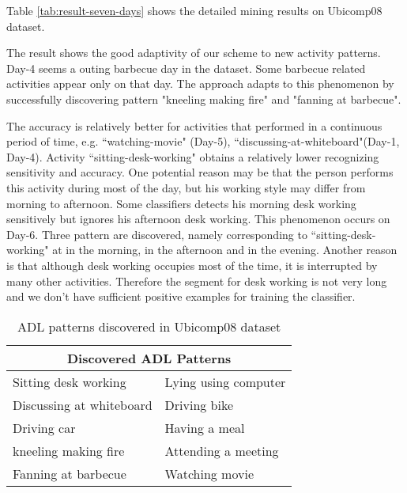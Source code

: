 \documentclass{sigchi}
\begin{document}
     
     Table \ref{tab:result-seven-days} shows the detailed mining results on Ubicomp08 dataset.
     
     The result shows the good adaptivity of our scheme to new activity patterns.
     Day-4 seems a outing barbecue day in the dataset. Some barbecue related activities appear only on that day.
     The approach adapts to this phenomenon by successfully discovering pattern "kneeling making fire" and "fanning at barbecue".

     The accuracy is relatively better for activities that performed in a continuous period of time, e.g. ``watching-movie" (Day-5), ``discussing-at-whiteboard"(Day-1, Day-4).
     Activity ``sitting-desk-working" obtains a relatively lower recognizing sensitivity and accuracy.
     One potential reason may be that the person performs this activity during most of the day, but his working style may differ from morning to afternoon.
     Some classifiers detects his morning desk working sensitively but ignores his afternoon desk working.
     This phenomenon occurs on Day-6. Three pattern are discovered, namely corresponding to ``sitting-desk-working" at in the morning, in the afternoon and in the evening.
     Another reason is that although desk working occupies most of the time, it is interrupted by many other activities.
     Therefore the segment for desk working is not very long and we don't have sufficient positive examples for training the classifier.

\begin{table}[htbp]
    \begin{tabular}{rr}
    \toprule
    \multicolumn{2}{c}{\textbf{Discovered ADL Patterns}} \\
    \midrule
    \multicolumn{1}{l}{Sitting desk working} & \multicolumn{1}{l}{Lying using computer} \\
    \multicolumn{1}{l}{Discussing at whiteboard} & \multicolumn{1}{l}{Driving bike} \\
    \multicolumn{1}{l}{Driving car} & \multicolumn{1}{l}{Having a meal} \\
    \multicolumn{1}{l}{kneeling making fire} & \multicolumn{1}{l}{Attending a meeting} \\
    \multicolumn{1}{l}{Fanning at barbecue} & \multicolumn{1}{l}{Watching movie} \\
    \bottomrule
    \end{tabular}%
    \caption{ADL patterns discovered in Ubicomp08 dataset}
  \label{tab: ADL patterns discovered ubicomp}%
\end{table}%
\end{document}
